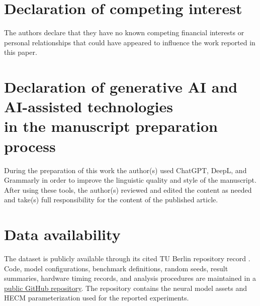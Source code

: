 \documentclass[review,nopreprintline]{elsarticle}
\begin{document}
\section*{Declaration of competing interest}
The authors declare that they have no known competing financial interests or personal relationships that could have appeared to influence the work reported in this paper.

\section*{Declaration of generative AI and AI-assisted technologies\\in the manuscript preparation process}
During the preparation of this work the author(s) used ChatGPT, DeepL, and Grammarly in order to improve the linguistic quality and style of the manuscript. After using these tools, the author(s) reviewed and edited the content as needed and take(s) full responsibility for the content of the published article.

\section*{Data availability}
The dataset is publicly available through its cited TU Berlin repository record \cite{LFP_DoE_Cycle_Aging_Dataset}. Code, model configurations, benchmark definitions, random seeds, result summaries, hardware timing records, and analysis procedures are maintained in a \href{https://github.com/FRzepka/1_SCRIPTS}{public GitHub repository}. The repository contains the neural model assets and HECM parameterization used for the reported experiments.



\end{document}

